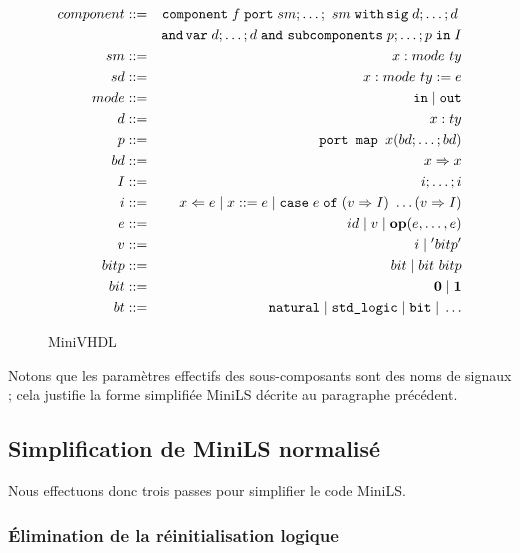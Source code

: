 \documentclass[a4paper]{article}
\newcommand{\p}[0]{\; \vert \;}
\newcommand{\mybox}[1]{\mbox{\tt{#1}}}
\newcommand{\Coloneqq}[0]{::=}
\newcommand{\coloneqq}[0]{::=}
\newcommand{\Op}[2]{\mybox{\bf{op}}(#1,\dots,#2)}
\newcommand{\Assign}[2]{#1 \Leftarrow #2}
\newcommand{\Affect}[2]{#1 \coloneqq #2}
\newcommand{\Case}[5]{\mybox{case} \; #1 \; \mybox{of} \; (#2 \Rightarrow #3) \
  \dots (#4 \Rightarrow #5)}
\begin{document}
\begin{figure}[htp]
  \centering
  \begin{eqnarray*}
    component & \Coloneqq & \mybox{component} \; f \; \mybox{port} \; sm;\dots;\
    sm \; \mybox{with} \, \mybox{sig} \; d; \dots; d \; \\
    & & \mybox{and} \, \mybox{var} \; d; \dots; d \; \mybox{and} \
    \mybox{subcomponents} \; p; \dots; p \; \mybox{in} \; I \\
    sm & \Coloneqq & x : mode \ ty \\
    sd & \Coloneqq & x : mode \ ty := e \\
    mode & \Coloneqq & \mybox{in} \p \mybox{out} \\
    d & \Coloneqq & x : ty \\
    p & \Coloneqq & \mybox{port map } x (bd;\dots;bd) \\
    bd & \Coloneqq & x \Rightarrow x \\
    I & \coloneqq & i; \dots; i \\
    i & \Coloneqq & \Assign{x}{e} \p \Affect{x}{e} \p \Case{e}{v}{I}{v}{I} \\
    e & \Coloneqq & id \; \vert \; v \; \vert \; \Op{e}{e} \\
    v & \Coloneqq & i \; \vert \; ' bitp ' \\
    bitp & \Coloneqq & bit \p bit \  bitp \\
    bit & \Coloneqq & \mathbf{0} \p \mathbf{1} \\
    bt & \Coloneqq & \mybox{natural} \p \mybox{std\_logic} \p \mybox{bit}
    \p \dots
  \end{eqnarray*}
  \caption{MiniVHDL}
  \label{fig:mvhdl}
\end{figure}

Notons que les param\`etres effectifs des sous-composants sont des noms de
signaux ; cela justifie la forme simplifi\'ee MiniLS d\'ecrite au paragraphe
pr\'ec\'edent.

\subsection{Simplification de MiniLS normalis\'e}

Nous effectuons donc trois passes pour simplifier le code MiniLS.

\subsubsection{\'Elimination de la r\'einitialisation logique}
\end{document}
